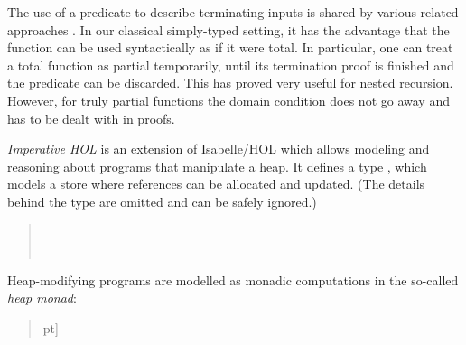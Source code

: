 \documentclass[copyright,creativecommons,sharealike]{eptcs}
\theoremstyle{remark}
\begin{document}
\begin{isabellebody}
\begin{isamarkuptext}
  The use of a predicate to describe terminating inputs is shared by
  various related
  approaches \cite{ConstableM85,dubois98,bovecapretta05,Greve09_defminterm}.
  In our classical simply-typed setting, it has the advantage
  that the function can be used syntactically as if it were total.  In
  particular, one can treat a total function as partial
  temporarily, until its termination proof is finished and the
  predicate can be discarded. This has proved very useful for nested
  recursion.  However, for truly partial functions the domain
  condition does not go away and has to be dealt with in proofs.\end{isamarkuptext}\isamarkuptrue {}
\isamarkuptrue \label{sec:imphol}
\begin{isamarkuptext}\emph{Imperative HOL} \cite{imperativeFP} is an extension of
  Isabelle/HOL
  which allows modeling and reasoning about programs that manipulate a
  heap. It defines a type , which models a store where
  references can be allocated and updated.
  (The details behind the type  are omitted and can be safely ignored.)
  \begin{quote}
    \\
    \\
  \end{quote}
  Heap-modifying programs are modelled as monadic computations in
  the so-called \emph{heap monad}:
\begin{quote}
  \4pt]
  \\

\end{quote}
\end{isamarkuptext}
\end{isabellebody}
\end{document}
